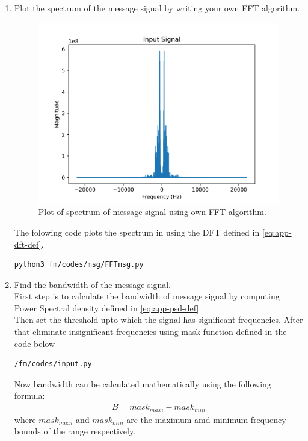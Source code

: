\begin{enumerate}[label=\arabic*.,ref=\thesection.\theenumi]
\item Plot the spectrum of the message signal by writing your own FFT algorithm.\\
	\solution
\begin{figure}[H]
\centering
\includegraphics[width=\columnwidth]{fm/msg/figs/FFTown/input2.png}
\caption{Plot of spectrum of message signal using own FFT algorithm.}
\label{fig:FFTo}
\end{figure}
The folowing code plots the spectrum in  using the DFT defined in  \eqref{eq:app-dft-def}.
\begin{lstlisting}
python3 fm/codes/msg/FFTmsg.py
\end{lstlisting}

\item Find the bandwidth of the message signal.\\
\solution First step is to calculate the bandwidth of message signal by computing Power Spectral density defined in \eqref{eq:app-psd-def} \\
Then set the threshold upto which the signal has significant frequencies.
After that eliminate insignificant frequencies using mask function defined in the code below\\
\begin{lstlisting}
/fm/codes/input.py
\end{lstlisting}
Now bandwidth can be calculated mathematically using the following formula:
\begin{align*}
B=mask_{maxi}-mask_{min}
\end{align*}
where $mask_{maxi}$ and $mask_{min} $ are the maximum amd minimum frequency bounds of the range  respectively.\\

\end{enumerate}
